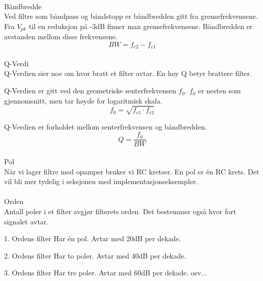 \paragraph{} \mbox{Båndbredde} \\
Ved filtre som båndpass og båndstopp er båndbredden gitt fra grensefrekvensene.
Fra $V_{pk}$ til en reduksjon på -3dB finner man grensefrekvensene.
Båndbredden er avstanden mellom disse frekvensene.
$$BW = f_{c2} - f_{c1}$$



\paragraph{} \mbox{Q-Verdi} \\
Q-Verdien sier noe om hvor bratt et filter avtar.
En høy Q betyr brattere filter.

Q-Verdien er gitt ved den geometriske senterfrekvensen $f_0$.
$f_0$ er nesten som gjennomsnitt, men tar høyde for logaritmisk skala.
$$f_0 = \sqrt{f_{c1} \cdot f_{c2}}$$

Q-Verdien er forholdet mellom senterfrekvensen og båndbredden.
$$Q = \frac{f_0}{BW}$$



\paragraph{} \mbox{Pol} \\
Når vi lager filtre med opamper bruker vi RC kretser.
En pol er én RC krets.
Det vil bli mer tydelig i seksjonen med implementasjonseksempler.



\paragraph{} \mbox{Orden} \\
Antall poler i et filter avgjør filterets orden.
Det bestemmer også hvor fort signalet avtar.

1. Ordens filter
Har én pol.
Avtar med 20dB per dekade.

2. Ordens filter
Har to poler.
Avtar med 40dB per dekade.

3. Ordens filter
Har tre poler.
Avtar med 60dB per dekade.
osv...
